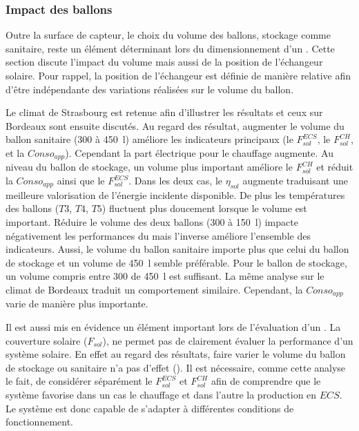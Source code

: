 \subsubsection{Impact des ballons} %
\label{ssub:impact_des_ballons}
Outre la surface de capteur, le choix du volume des ballons, stockage comme sanitaire,
reste un élément déterminant lors du dimensionnement d’un . Cette section discute
l’impact du volume mais aussi de la position de l’échangeur solaire. Pour rappel, la
position de l’échangeur est définie de manière relative afin d’être indépendante des
variations réalisées sur le volume du ballon.

Le climat de Strasbourg est retenue afin d’illustrer les résultats et ceux sur Bordeaux
sont ensuite discutés. Au regard des résultat, augmenter le volume du ballon sanitaire
(\num{300} à \SI{450}{\litre}) améliore les indicateurs principaux (le $F_{sol}^{ECS}$, le
$F_{sol}^{CH}$, et la $Conso_{app}$). Cependant la part électrique pour le chauffage
augmente. Au niveau du ballon de stockage, un volume plus important améliore le $F_{sol}^{CH}$
et réduit la $Conso_{app}$ ainsi que le $F_{sol}^{ECS}$. Dans les deux cas, le $\eta_{sol}$
augmente traduisant une meilleure valorisation de l’énergie incidente disponible.
De plus les températures des ballons ($T3$, $T4$, $T5$) fluctuent plus doucement lorsque le
volume est important. Réduire le volume des deux ballons (\num{300} à \SI{150}{\litre})
impacte négativement les performances du  mais l’inverse améliore l’ensemble des
indicateurs. Aussi, le volume du ballon sanitaire importe plus que celui du ballon de
stockage et un volume de \SI{450}{\litre} semble préférable. Pour le ballon de stockage,
un volume compris entre \num{300} de \SI{450}{\litre} est suffisant. La même analyse sur
le climat de Bordeaux traduit un comportement similaire. Cependant, la $Conso_{app}$
varie de manière plus importante.

Il est aussi mis en évidence un élément important lors de l’évaluation d’un . La
couverture solaire ($F_{sol}$), ne permet pas de clairement évaluer la performance d’un
système solaire. En effet au regard des résultats, faire varier le volume du ballon de
stockage ou sanitaire n’a pas d’effet (). Il est
nécessaire, comme cette analyse le fait, de considérer séparément le $F_{sol}^{ECS}$ et
$F_{sol}^{CH}$ afin de comprendre que le système favorise dans un cas le chauffage et dans
l’autre la production en $ECS$. Le système est donc capable de s’adapter à
différentes conditions de fonctionnement.

